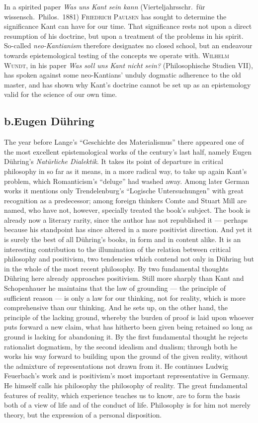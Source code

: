 \documentclass[12pt,a4paper]{book}
\newcommand{\opage}[1]{\marginnote{\footnotesize\textit{[#1]}}}
\begin{document}
In a spirited paper \textit{Was uns Kant sein kann} (Vierteljahrsschr.\ für
wissensch.\ Philos.\ 1881) \textsc{Friedrich Paulsen} has sought to determine the
significance Kant can have for our time. That significance rests not upon a
direct resumption of his doctrine, but upon a treatment of the problems in his
spirit. So-called \emph{neo-Kantianism} therefore designates no closed school,
but an endeavour towards epistemological testing of the concepts we operate with.
\textsc{Wilhelm Wundt}, in his paper \textit{Was soll uns Kant nicht sein?}
(Philosophische Studien VII), has spoken against some neo-Kantians' unduly
dogmatic adherence to the old master, and has shown why Kant's doctrine cannot be
set up as an epistemology valid for the science of our own time.

\subsection*{b.\quad Eugen Dühring}

The year before Lange's ``Geschichte des Materialismus'' there appeared one of
the most excellent epistemological works of the century's last half, namely Eugen
Dühring's \textit{Natürliche Dialektik}. It takes its point of departure in
critical philosophy in so far as it means, in a more radical way, to take up
again Kant's problem, which Romanticism's ``deluge'' had washed away. Among later
German works it mentions only Trendelenburg's ``Logische Untersuchungen'' with
great recognition as a predecessor; among foreign thinkers Comte and Stuart Mill
are named, who have not, however, specially treated the book's subject. The book
is already now a literary rarity, since the author has not republished it ---
perhaps because his standpoint has since altered in a more positivist direction.
And yet it is surely the best of all Dühring's books, in form and in content
alike. It is an interesting contribution to the illumination of the relation
between critical philosophy and positivism, two tendencies which contend not only
in Dühring but in the whole of the most recent philosophy. By two fundamental
thoughts Dühring here already approaches \opage{554}positivism. Still more sharply than Kant
and Schopenhauer he maintains that the law of grounding --- the principle of
sufficient reason --- is only a law for our thinking, not for reality, which is
more comprehensive than our thinking. And he sets up, on the other hand, the
principle of the lacking ground, whereby the burden of proof is laid upon whoever
puts forward a new claim, what has hitherto been given being retained so long as
ground is lacking for abandoning it. By the first fundamental thought he rejects
rationalist dogmatism, by the second idealism and dualism; through both he works
his way forward to building upon the ground of the given reality, without the
admixture of representations not drawn from it. He continues Ludwig Feuerbach's
work and is positivism's most important representative in Germany. He himself
calls his philosophy the philosophy of reality. The great fundamental features of
reality, which experience teaches us to know, are to form the basis both of a
view of life and of the conduct of life. Philosophy is for him not merely theory,
but the expression of a personal disposition.
\end{document}
